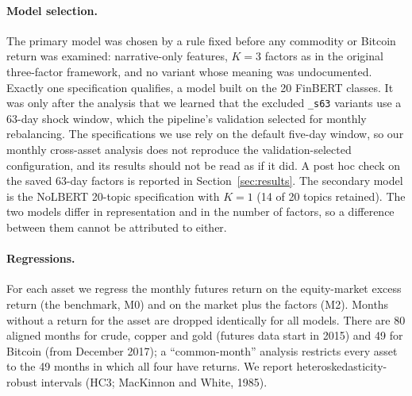 \documentclass[11pt]{article}
\begin{document}
\paragraph{Model selection.} The primary model was chosen by a rule fixed before any commodity or Bitcoin return was examined: narrative-only features, $K=3$ factors as in the original three-factor framework, and no variant whose meaning was undocumented. Exactly one specification qualifies, a model built on the 20 FinBERT classes. It was only after the analysis that we learned that the excluded \texttt{\_s63} variants use a 63-day shock window, which the pipeline's validation selected for monthly rebalancing. The specifications we use rely on the default five-day window, so our monthly cross-asset analysis does not reproduce the validation-selected configuration, and its results should not be read as if it did. A post hoc check on the saved 63-day factors is reported in Section~\ref{sec:results}. The secondary model is the NoLBERT 20-topic specification with $K=1$ (14 of 20 topics retained). The two models differ in representation and in the number of factors, so a difference between them cannot be attributed to either.

\paragraph{Regressions.} For each asset we regress the monthly futures return on the equity-market excess return (the benchmark, M0) and on the market plus the factors (M2). Months without a return for the asset are dropped identically for all models. There are 80 aligned months for crude, copper and gold (futures data start in 2015) and 49 for Bitcoin (from December 2017); a ``common-month'' analysis restricts every asset to the 49 months in which all four have returns. We report heteroskedasticity-robust intervals (HC3; MacKinnon and White, 1985).
\end{document}
